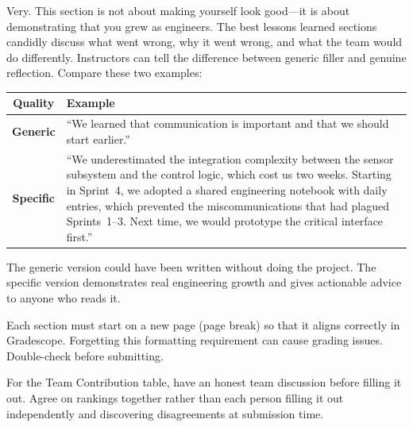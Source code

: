 \begin{faqbox}
Very. This section is not about making yourself look good---it is about demonstrating that you grew as engineers. The best lessons learned sections candidly discuss what went wrong, why it went wrong, and what the team would do differently. Instructors can tell the difference between generic filler and genuine reflection. Compare these two examples:

\begin{center}
\renewcommand{\arraystretch}{1.3}
\begin{tabularx}{0.95\textwidth}{>{\bfseries\color{warnred}}c >{\raggedright\arraybackslash}X}
\toprule
\textbf{Quality} & \textbf{Example} \\
\midrule
\textcolor{warnred}{Generic} & ``We learned that communication is important and that we should start earlier.'' \\
\textcolor{tipgreen}{Specific} & ``We underestimated the integration complexity between the sensor subsystem and the control logic, which cost us two weeks. Starting in Sprint~4, we adopted a shared engineering notebook with daily entries, which prevented the miscommunications that had plagued Sprints~1--3. Next time, we would prototype the critical interface first.'' \\
\bottomrule
\end{tabularx}
\end{center}

\noindent The generic version could have been written without doing the project. The specific version demonstrates real engineering growth and gives actionable advice to anyone who reads it.
\end{faqbox}

\begin{warnbox}
Each section must start on a new page (page break) so that it aligns correctly in Gradescope. Forgetting this formatting requirement can cause grading issues. Double-check before submitting.
\end{warnbox}

\begin{tipbox}
For the Team Contribution table, have an honest team discussion before filling it out. Agree on rankings together rather than each person filling it out independently and discovering disagreements at submission time.
\end{tipbox}


